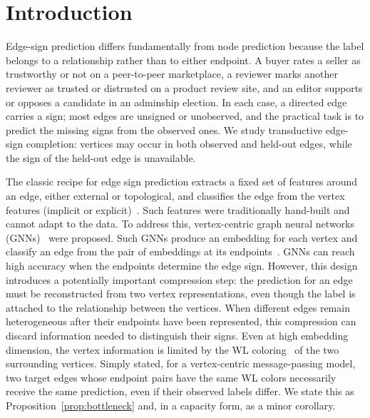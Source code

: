 \documentclass[sigconf, review, anonymous]{acmart}
\theoremstyle{plain}
\theoremstyle{definition}
\begin{document}


\maketitle

\section{Introduction}

Edge-sign prediction differs fundamentally from node prediction because the label belongs to a relationship rather than to either endpoint. A buyer rates a seller as trustworthy or not on a peer-to-peer marketplace, a reviewer marks another reviewer as trusted or distrusted on a product review site, and an editor supports or opposes a candidate in an adminship election. In each case, a directed edge carries a sign; most edges are unsigned or unobserved, and the practical task is to predict the missing signs from the observed ones. We study transductive edge-sign completion: vertices may occur in both observed and held-out edges, while the sign of the held-out edge is unavailable.

The classic recipe for edge sign prediction extracts a fixed set of features around an edge, either external or topological, and classifies the edge from the vertex features (implicit or explicit)~\citep{leskovec2010predicting}. Such features were traditionally hand-built and cannot adapt to the data. To address this, vertex-centric graph neural networks (GNNs)~\citep{kipf2017semi, gilmer2017neural} were proposed. Such GNNs produce an embedding for each vertex and classify an edge from the pair of embeddings at its endpoints~\citep{derr2018signed, huang2019signed}. GNNs can reach high accuracy when the endpoints determine the edge sign. However, this design introduces a potentially important compression step: the prediction for an edge must be reconstructed from two vertex representations, even though the label is attached to the relationship between the vertices. When different edges remain heterogeneous after their endpoints have been represented, this compression can discard information needed to distinguish their signs. Even at high embedding dimension, the vertex information is limited by the WL coloring~\citep{weisfeiler1968reduction} of the two surrounding vertices.  Simply stated, for a vertex-centric message-passing model, two target edges whose endpoint pairs have the same WL colors necessarily receive the same prediction, even if their observed labels differ.  We state this as Proposition~\ref{prop:bottleneck} and, in a capacity form, as a minor corollary. 
\end{document}
